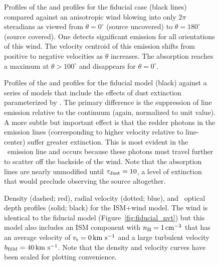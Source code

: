 \documentclass[12pt,preprint]{aastex}
\begin{document}
\begin{figure}
\caption{
Profiles of the  and  profiles for the fiducial
case (black lines) compared against an anisotropic wind blowing into
only $2\pi$ steradians as viewed from $\theta = 0^\circ$ (source
uncovered) to $\theta = 180^\circ$ (source covered).  One detects
significant emission for all orientations of this wind. The velocity
centroid of this 
emission shifts from positive to negative velocities as $\theta$
increases.  The absorption reaches a maximum at $\theta > 100^\circ$
and disappears for $\theta = 0^\circ$.
}
\label{fig:anisotropic}
\end{figure}

\begin{figure}
\caption{
Profiles of the  and  profiles for the fiducial
model (black) against a series of models that include the effects of
dust extinction parameterized by \taud.  The primary difference is the suppression of line
emission relative to the continuum (again, normalized to unit value).
A more subtle but important effect is that the redder photons in the
emission lines (corresponding to higher velocity relative to
line-center) suffer greater extinction.  This is most evident in the
\feiic\ emission line and occurs because these photons must
travel further to scatter off the backside of the wind.  Note that
the absorption lines are nearly unmodified until $\tau_{\rm dust} = 10$, a
level of extinction that would preclude observing the source
altogether.
}
\label{fig:dust}
\end{figure}

\begin{figure}
\caption{
Density (dashed; red), radial velocity (dotted; blue), and
\mgiia\ optical depth profiles (solid; black) for the ISM+wind
model.  The wind is identical to the fiducial model
(Figure~\ref{fig:fiducial_nvt}) but this model also includes an ISM component
with $n_{\rm H} = 1 \, {\rm cm^{-3}}$ that has an average velocity of $v_{\rm r} = 0
\, {\rm km~s^{-1}}$ and a large turbulent velocity $b_{\rm ISM} = 40 \, {\rm km~s^{-1}}$.
Note that the density and velocity curves have been scaled for plotting
convenience.  
}
\label{fig:ISM}
\end{figure}
\end{document}
